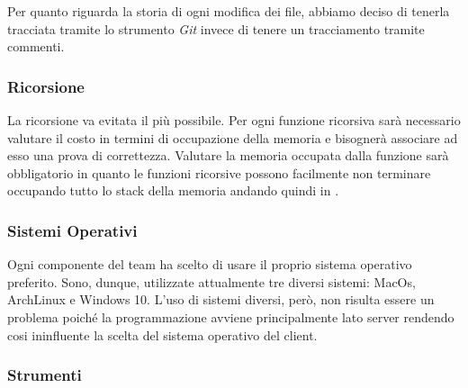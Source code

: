 Per quanto riguarda la storia di ogni modifica dei file, abbiamo deciso di tenerla tracciata tramite lo strumento \textit{Git} invece di tenere un tracciamento tramite commenti.

  
\subsubsection{Ricorsione}
La ricorsione va evitata il più possibile. Per ogni funzione ricorsiva sarà necessario valutare il costo in termini di occupazione della memoria e bisognerà associare ad esso una prova di correttezza.
Valutare la memoria occupata dalla funzione sarà obbligatorio in quanto le funzioni ricorsive possono facilmente non terminare occupando tutto lo stack della memoria andando quindi in .

\subsubsection{Sistemi Operativi}
Ogni componente del team ha scelto di usare il proprio sistema operativo preferito. Sono, dunque, utilizzate attualmente tre diversi sistemi: MacOs,  ArchLinux e Windows 10. L'uso di sistemi diversi, però, non risulta essere un problema poiché la programmazione avviene principalmente lato server rendendo cosi ininfluente la scelta del sistema operativo del client.

\subsubsection{Strumenti}
